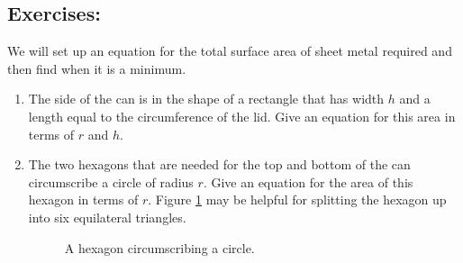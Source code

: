 \subsection*{Exercises:}
We will set up an equation for the total surface area of sheet metal required and then find when it is a minimum.
	\begin{enumerate}
	\item The side of the can is in the shape of a rectangle that has width $h$ and a length equal to the circumference of the lid. Give an equation for this area in terms of $r$ and $h$.
	\item The two hexagons that are needed for the top and bottom of the can circumscribe a circle of radius $r$. Give an equation for the area of this hexagon in terms of $r$. Figure \ref{hexagoncircle} may be helpful for splitting the hexagon up into six equilateral triangles.
\begin{figure}[h]
\caption{A hexagon circumscribing a circle.}
\centering
{}
\label{hexagoncircle}
\end{figure}

\end{enumerate}
